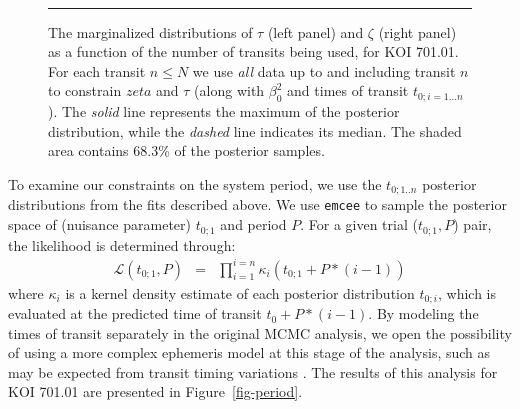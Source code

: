 \begin{figure}[t] 
\begin{center} 
\mbox{
\quad
{}
}
\caption{The marginalized distributions of $\tau$ (left panel) and
  $\zeta$ (right panel) as a function of the number of transits being
  used, for KOI 701.01.  For each transit $n \leq N$ we use {\it all}
  data up to and including transit $n$ to constrain $zeta$ and $\tau$
  (along with $\beta_0^2$ and times of transit $t_{0;i=1...n}$).  The
  {\it solid} line represents the maximum of the posterior
  distribution, while the {\it dashed} line indicates its median.  The
  shaded area contains 68.3\% of the posterior samples.}
\hspace*{\fill}  
\hrule
\label{fig-marg} 
\end{center} 
\end{figure}

To examine our constraints on the system period, we use the
$t_{0;1..n}$ posterior distributions from the fits described above.
We use {\tt emcee} to sample the posterior space of (nuisance
parameter) $t_{0;1}$ and period $P$.  For a given trial ($t_{0;1}, P$)
pair, the likelihood is determined through:
\begin{eqnarray}
\mathcal{L}(t_{0;1}, P) & = & \prod_{i=1}^{i=n} \kappa_i(t_{0;1} + P * (i-1))
\end{eqnarray}
where $\kappa_i$ is a kernel density estimate of each posterior
distribution $t_{0;i}$, which is evaluated at the predicted time of
transit $t_0 + P * (i-1)$.  By modeling the times of transit
separately in the original MCMC analysis, we open the possibility of
using a more complex ephemeris model at this stage of the analysis,
such as may be expected from transit timing variations
\citep{2005MNRAS.359..567A,2005Sci...307.1288H}.  The results of this
analysis for KOI 701.01 are presented in Figure~\ref{fig-period}.

